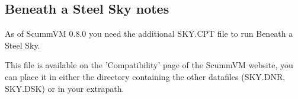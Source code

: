 \subsection{Beneath a Steel Sky notes}
As of ScummVM 0.8.0 you need the additional SKY.CPT file to run Beneath a 
Steel Sky.

This file is available on the 'Compatibility' page of the ScummVM
website, you can place it in either the directory containing the other
datafiles (SKY.DNR, SKY.DSK) or in your extrapath.
